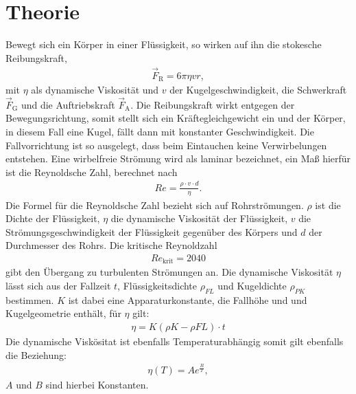 \section{Theorie}
\label{sec:theorie}
Bewegt sich ein Körper in einer Flüssigkeit, so wirken auf
ihn die stokesche Reibungskraft,
\begin{align}
  \vec{F}_{\mathrm{R}}=6\pi\eta v r,
\end{align}
mit $\eta$ als dynamische Viskosität und $v$ der Kugelgeschwindigkeit,
die Schwerkraft $\vec{F}_{\mathrm{G}}$ und die Auftriebskraft $\vec{F}_{\mathrm{A}}$.
Die Reibungskraft wirkt entgegen der Bewegungsrichtung, somit stellt sich ein
Kräftegleichgewicht ein und der Körper, in diesem Fall eine Kugel,
fällt dann mit konstanter Geschwindigkeit.
Die Fallvorrichtung ist so ausgelegt, dass beim Eintauchen
keine Verwirbelungen entstehen. Eine wirbelfreie Strömung
wird als laminar bezeichnet, ein Maß hierfür ist die Reynoldsche Zahl, berechnet nach
\begin{align}
Re=\frac{\rho \cdot v \cdot d}{\eta}\label{eqn:rey}.
\end{align}
Die Formel für die Reynoldsche Zahl bezieht sich auf Rohrströmungen.
$\rho$ ist die Dichte der Flüssigkeit, $\eta$ die dynamische Viskosität der
Flüssigkeit, $v$ die Strömungsgeschwindigkeit der Flüssigkeit
gegenüber des Körpers und $d$ der Durchmesser des Rohrs\cite{rey}.
Die kritische Reynoldzahl
\begin{align*}
Re_{\mathrm{krit}}=2040 
\end{align*}
gibt den Übergang zu turbulenten Strömungen an.\cite{reykrit}
Die dynamische Viskosität $\eta$ lässt sich
aus der Fallzeit $t$, Flüssigkeitsdichte $\rho_{FL}$ und Kugeldichte $\rho_{PK}$
bestimmen. $K$ ist dabei eine  Apparaturkonstante, die Fallhöhe
und und Kugelgeometrie enthält, für $\eta$ gilt:
\begin{align}
  \eta=K(\rho{K}-\rho{FL})\cdot t \label{eqn:vis}
\end{align}
Die dynamische Viskösitat ist ebenfalls Temperaturabhängig somit gilt ebenfalls die Beziehung:
\begin{align}
  \eta(T)= A e^{\frac{B}{T}}\label{eqn:andra},
\end{align}
$A$ und $B$ sind hierbei Konstanten.
